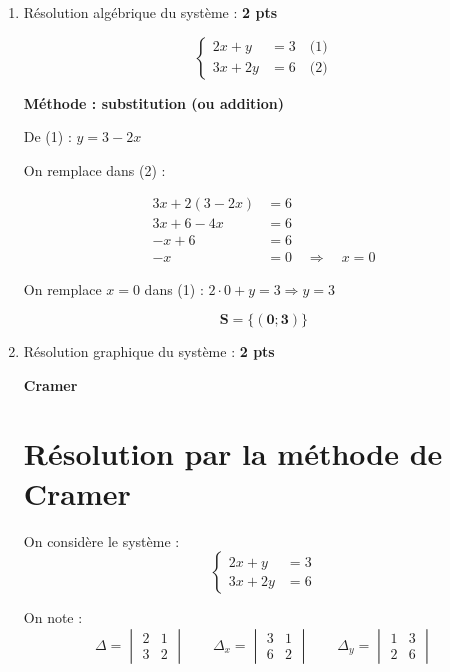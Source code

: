 \documentclass[12pt,a4paper]{article}
\begin{document}
\begin{enumerate}
    \item Résolution algébrique du système : \hfill \textbf{2 pts}
    
    \[
    \left\{
    \begin{aligned}
        2x + y &= 3 \quad \text{(1)} \\
        3x + 2y &= 6 \quad \text{(2)}
    \end{aligned}
    \right.
    \]

    \textbf{Méthode : substitution (ou addition)}

    De (1) : \( y = 3 - 2x \)

    On remplace dans (2) :

    \[
    \begin{aligned}
    3x + 2(3 - 2x) &= 6 \\
    3x + 6 - 4x &= 6 \\
    -x + 6 &= 6 \\
    -x &= 0 \quad \Rightarrow \quad x = 0
    \end{aligned}
    \]

    On remplace \( x = 0 \) dans (1) : \( 2 \cdot 0 + y = 3 \Rightarrow y = 3 \)

     \begin{resultbox}
    \[
    \mathbf{S =\{(0;3)\}}
    \]
		\end{resultbox}

    \item Résolution graphique du système : \hfill \textbf{2 pts}

    \textbf{Cramer}

    \section*{Résolution par la méthode de Cramer}

On considère le système :
\[
\left\{
\begin{aligned}
2x + y &= 3 \\
3x + 2y &= 6
\end{aligned}
\right.
\]

On note :
\[
\Delta = 
\begin{vmatrix}
2 & 1 \\
3 & 2
\end{vmatrix}
\qquad
\Delta_x = 
\begin{vmatrix}
3 & 1 \\
6 & 2
\end{vmatrix}
\qquad
\Delta_y = 
\begin{vmatrix}
1 & 3 \\
2 & 6
\end{vmatrix}
\]


\end{enumerate}
\end{document}
